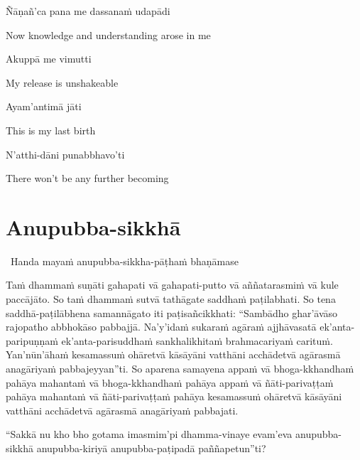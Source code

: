 Ñāṇañ'ca pana me dassanaṁ udapādi

\begin{english}
  Now knowledge and understanding arose in me
\end{english}

Akuppā me vimutti

\begin{english}
  My release is unshakeable
\end{english}

Ayam'antimā jāti

\begin{english}
  This is my last birth
\end{english}

N'atthi-dāni punabbhavo'ti

\begin{english}
  There won't be any further becoming
\end{english}

\suttaRef{[SN 56.11]}

\ifdigitalversion{}\fi



\section{Anupubba-sikkhā}

\begin{leader}
  \anglebracketleft\ \hspace{-0.5mm}Handa mayaṁ anupubba-sikkha-pāṭhaṁ bhaṇāmase \hspace{-0.5mm}\anglebracketright\
\end{leader}

Taṁ dhammaṁ suṇāti gahapati vā gahapati-putto vā aññatarasmiṁ vā kule paccājāto. So taṁ dhammaṁ sutvā tathāgate saddhaṁ paṭilabhati. So tena saddhā-paṭilābhena samannāgato iti paṭisañcikkhati: ``Sambādho ghar'āvāso rajopatho abbhokāso pabbajjā. Na'y'idaṁ sukaraṁ agāraṁ ajjhāvasatā ek'anta-paripuṇṇaṁ ek'anta-parisuddhaṁ sankhalikhitaṁ brahmacariyaṁ carituṁ. Yan'nūn'āhaṁ kesamassuṁ ohāretvā kāsāyāni vatthāni acchādetvā agārasmā anagāriyaṁ pabbajeyyan''ti. So aparena samayena appaṁ vā bhoga-kkhandhaṁ pahāya mahantaṁ vā bhoga-kkhandhaṁ pahāya appaṁ vā ñāti-parivaṭṭaṁ pahāya mahantaṁ vā ñāti-parivaṭṭaṁ pahāya kesamassuṁ ohāretvā kāsāyāni vatthāni acchādetvā agārasmā anagāriyaṁ pabbajati.

\suttaRef{[MN 27 / 38 / 51]}

``Sakkā nu kho bho gotama imasmim'pi dhamma-vinaye evam'eva anupubba-sikkhā anupubba-kiriyā anupubba-paṭipadā paññapetun''ti?

